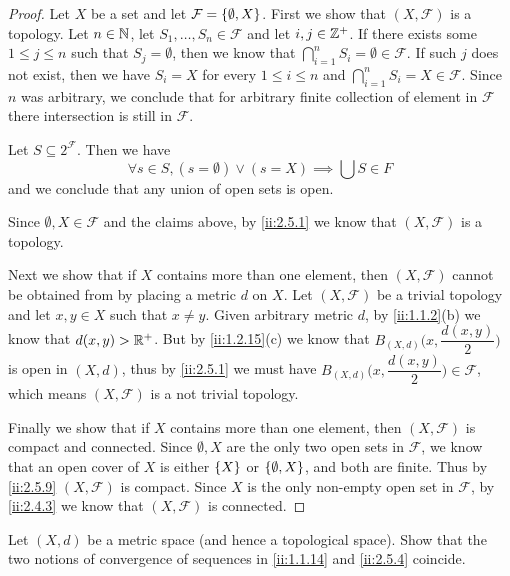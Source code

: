 \begin{proof}
  Let \(X\) be a set and let \(\mathcal{F} = \left\lbrace\emptyset, X\right\rbrace\).
  First we show that \((X, \mathcal{F})\) is a topology.
  Let \(n \in \mathbb{N}\), let \(S_1, \dots, S_n \in \mathcal{F}\) and let \(i, j \in \mathbb{Z}^+\).
  If there exists some \(1 \leq j \leq n\) such that \(S_j = \emptyset\), then we know that \(\bigcap_{i = 1}^n S_i = \emptyset \in \mathcal{F}\).
  If such \(j\) does not exist, then we have \(S_i = X\) for every \(1 \leq i \leq n\) and \(\bigcap_{i = 1}^n S_i = X \in \mathcal{F}\).
  Since \(n\) was arbitrary, we conclude that for arbitrary finite collection of element in \(\mathcal{F}\) there intersection is still in \(\mathcal{F}\).

  Let \(S \subseteq 2^{\mathcal{F}}\).
  Then we have
  \[
    \forall s \in S, (s = \emptyset) \lor (s = X) \implies \bigcup S \in F
  \]
  and we conclude that any union of open sets is open.

  Since \(\emptyset, X \in \mathcal{F}\) and the claims above, by \cref{ii:2.5.1} we know that \((X, \mathcal{F})\) is a topology.

  Next we show that if \(X\) contains more than one element, then \((X, \mathcal{F})\) cannot be obtained from by placing a metric \(d\) on \(X\).
  Let \((X, \mathcal{F})\) be a trivial topology and let \(x, y \in X\) such that \(x \neq y\).
  Given arbitrary metric \(d\), by \cref{ii:1.1.2}(b) we know that \(d(x, y) > \mathbb{R}^+\).
  But by \cref{ii:1.2.15}(c) we know that \(B_{(X, d)}\big(x, \dfrac{d(x, y)}{2}\big)\) is open in \((X, d)\), thus by \cref{ii:2.5.1} we must have \(B_{(X, d)}\big(x, \dfrac{d(x, y)}{2}\big) \in \mathcal{F}\), which means \((X, \mathcal{F})\) is a not trivial topology.

  Finally we show that if \(X\) contains more than one element, then \((X, \mathcal{F})\) is compact and connected.
  Since \(\emptyset, X\) are the only two open sets in \(\mathcal{F}\), we know that an open cover of \(X\) is either \(\left\lbrace X\right\rbrace\) or \(\left\lbrace\emptyset, X\right\rbrace\), and both are finite.
  Thus by \cref{ii:2.5.9} \((X, \mathcal{F})\) is compact.
  Since \(X\) is the only non-empty open set in \(\mathcal{F}\), by \cref{ii:2.4.3} we know that \((X, \mathcal{F})\) is connected.
\end{proof}

\begin{ex}\label{ii:ex:2.5.2}
  Let \((X, d)\) be a metric space
  (and hence a topological space).
  Show that the two notions of convergence of sequences in \cref{ii:1.1.14} and \cref{ii:2.5.4} coincide.
\end{ex}

